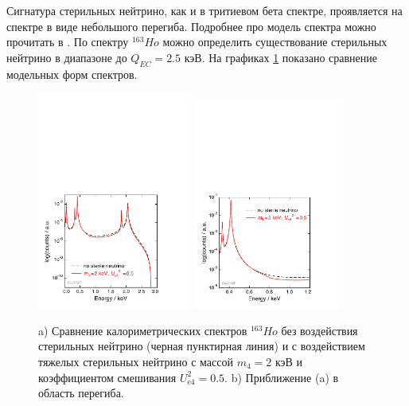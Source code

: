 \documentclass[a4paper,14pt]{extreport}
\begin{document}
Сигнатура стерильных нейтрино, как и в тритиевом бета спектре, проявляется на спектре в виде небольшого перегиба. Подробнее про модель спектра можно прочитать в \cite{dm-kev-sterile-neutrino-whitepaper}. По спектру $ ^{163}Ho $ можно определить существование стерильных нейтрино в диапазоне до $ Q_{E C} = 2.5 $ кэВ. На графиках \ref{fig:ste-kink} показано сравнение модельных форм спектров.

\begin{figure}
  \centering
  \includegraphics[width = 0.45\textwidth]{img/electron_capture/ste_full_spe.pdf}
  \includegraphics[width = 0.44\textwidth]{img/electron_capture/ste_det_spe.pdf}
    \caption{a) Сравнение калориметрических спектров $ ^{163}Ho $ без воздействия стерильных нейтрино (черная пунктирная линия) и с воздействием тяжелых стерильных нейтрино с массой $m_4=2$ кэВ и коэффициентом смешивания $U_{\mathrm{e4}}^2 = 0.5$. b) Приближение (a) в область перегиба.}
    \label{fig:ste-kink}
\end{figure}
\end{document}
